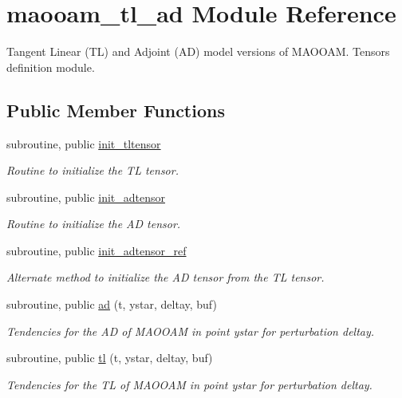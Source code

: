 \hypertarget{classmaooam__tl__ad}{\section{maooam\-\_\-tl\-\_\-ad Module Reference}
\label{classmaooam__tl__ad}
}


Tangent Linear (T\-L) and Adjoint (A\-D) model versions of M\-A\-O\-O\-A\-M. Tensors definition module.  


\subsection*{Public Member Functions}
\begin{DoxyCompactItemize}
\item 
subroutine, public \hyperlink{classmaooam__tl__ad_aa9fa649b66f2ea950fc6a14fafa2f97e}{init\-\_\-tltensor}
\begin{DoxyCompactList}\small\item\em Routine to initialize the T\-L tensor. \end{DoxyCompactList}\item 
subroutine, public \hyperlink{classmaooam__tl__ad_a5fa938c70062d80a0bf3f02c477a3bb6}{init\-\_\-adtensor}
\begin{DoxyCompactList}\small\item\em Routine to initialize the A\-D tensor. \end{DoxyCompactList}\item 
subroutine, public \hyperlink{classmaooam__tl__ad_ab29255f54be1bc044a104398dbd3a072}{init\-\_\-adtensor\-\_\-ref}
\begin{DoxyCompactList}\small\item\em Alternate method to initialize the A\-D tensor from the T\-L tensor. \end{DoxyCompactList}\item 
subroutine, public \hyperlink{classmaooam__tl__ad_aa429683bf8b3c441dee1bab717e6f7fb}{ad} (t, ystar, deltay, buf)
\begin{DoxyCompactList}\small\item\em Tendencies for the A\-D of M\-A\-O\-O\-A\-M in point ystar for perturbation deltay. \end{DoxyCompactList}\item 
subroutine, public \hyperlink{classmaooam__tl__ad_a27dc302cf2e677f37ac6cf7887b06e1b}{tl} (t, ystar, deltay, buf)
\begin{DoxyCompactList}\small\item\em Tendencies for the T\-L of M\-A\-O\-O\-A\-M in point ystar for perturbation deltay. \end{DoxyCompactList}\end{DoxyCompactItemize}
